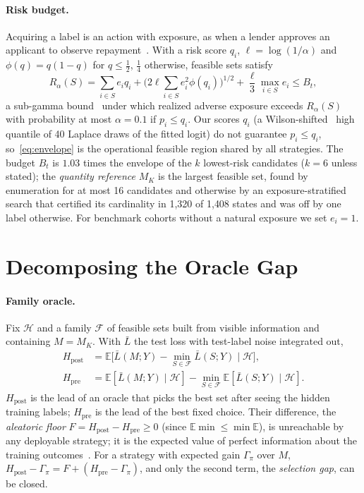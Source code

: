 \documentclass[runningheads]{llncs}
\begin{document}
\paragraph{Risk budget.} Acquiring a label is an action with exposure, as when a lender approves an applicant to observe repayment~\cite{lakkaraju2017selective,wei2021selective}. With a risk score $q_i$, $\ell=\log(1/\alpha)$ and $\phi(q)=q(1-q)$ for $q\le\frac12$, $\frac14$ otherwise, feasible sets satisfy
\begin{equation}
 R_\alpha(S)=\sum_{i\in S}e_iq_i+\Big(2\ell\sum_{i\in S}e_i^2\phi(q_i)\Big)^{1/2}+\frac{\ell}{3}\max_{i\in S}e_i\le B_t,
 \label{eq:envelope}
\end{equation}
a sub-gamma bound~\cite{boucheron2013concentration} under which realized adverse exposure exceeds $R_\alpha(S)$ with probability at most $\alpha=0.1$ if $p_i\le q_i$. Our scores $q_i$ (a Wilson-shifted~\cite{wilson1927probable} high quantile of 40 Laplace draws of the fitted logit) do not guarantee $p_i\le q_i$, so~\eqref{eq:envelope} is the operational feasible region shared by all strategies. The budget $B_t$ is $1.03$ times the envelope of the $k$ lowest-risk candidates ($k=6$ unless stated); the \emph{quantity reference} $M_K$ is the largest feasible set, found by enumeration for at most 16 candidates and otherwise by an exposure-stratified search that certified its cardinality in 1{,}320 of 1{,}408 states and was off by one label otherwise. For benchmark cohorts without a natural exposure we set $e_i=1$.

\section{Decomposing the Oracle Gap}
\label{sec:protocol}
\paragraph{Family oracle.} Fix $\mathcal H$ and a family $\mathcal F$ of feasible sets built from visible information and containing $M=M_K$. With $\bar L$ the test loss with test-label noise integrated out,
\begin{align}
 H_{\mathrm{post}}&=\mathbb E\big[\bar L(M;Y)-\min_{S\in\mathcal F}\bar L(S;Y)\mid\mathcal H\big],\\
 H_{\mathrm{pre}}&=\mathbb E[\bar L(M;Y)\mid\mathcal H]-\min_{S\in\mathcal F}\mathbb E[\bar L(S;Y)\mid\mathcal H].
\end{align}
$H_{\mathrm{post}}$ is the lead of an oracle that picks the best set after seeing the hidden training labels; $H_{\mathrm{pre}}$ is the lead of the best fixed choice. Their difference, the \emph{aleatoric floor} $F=H_{\mathrm{post}}-H_{\mathrm{pre}}\ge0$ (since $\mathbb E\min\le\min\mathbb E$), is unreachable by any deployable strategy; it is the expected value of perfect information about the training outcomes~\cite{howard1966information}. For a strategy with expected gain $\Gamma_\pi$ over $M$, $H_{\mathrm{post}}-\Gamma_\pi=F+(H_{\mathrm{pre}}-\Gamma_\pi)$, and only the second term, the \emph{selection gap}, can be closed.
\end{document}
